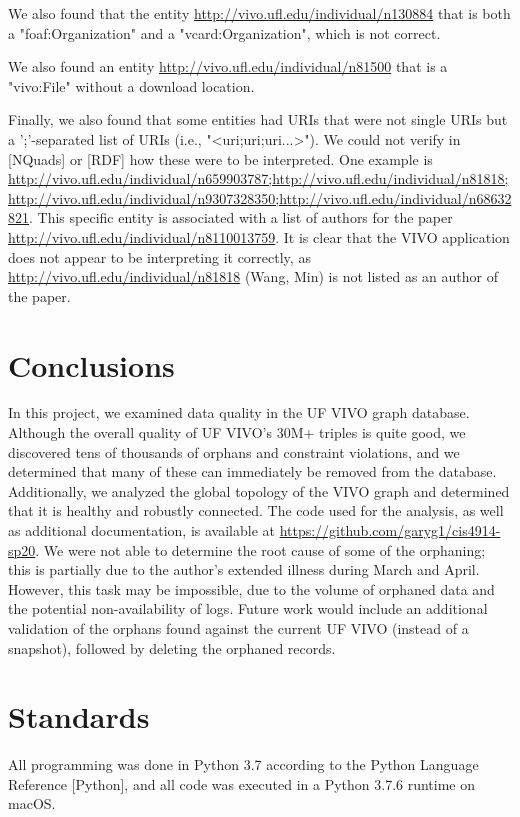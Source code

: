 \documentclass[11pt]{article}
\begin{document}
We also found that the entity \url{http://vivo.ufl.edu/individual/n130884} that is both a "foaf:Organization" and a "vcard:Organization", which is not correct.

We also found an entity \url{http://vivo.ufl.edu/individual/n81500} that is a "vivo:File" without a download location.

Finally, we also found that some entities had URIs that were not single URIs but a ';'-separated list of URIs (i.e., "<uri;uri;uri...>"). We could not verify in [NQuads] or [RDF] how these were to be interpreted. One example is \url{http://vivo.ufl.edu/individual/n659903787;http://vivo.ufl.edu/individual/n81818;http://vivo.ufl.edu/individual/n9307328350;http://vivo.ufl.edu/individual/n68632821}. This specific entity is associated with a list of authors for the paper \url{http://vivo.ufl.edu/individual/n8110013759}. It is clear that the VIVO application does not appear to be interpreting it correctly, as \url{http://vivo.ufl.edu/individual/n81818} (Wang, Min) is not listed as an author of the paper.

\section*{Conclusions}
In this project, we examined data quality in the UF VIVO graph database. Although the overall quality of UF VIVO's 30M+ triples is quite good, we discovered tens of thousands of orphans and constraint violations, and we determined that many of these can immediately be removed from the database. Additionally, we analyzed the global topology of the VIVO graph and determined that it is healthy and robustly connected. The code used for the analysis, as well as additional documentation, is available at \url{https://github.com/garyg1/cis4914-sp20}. We were not able to determine the root cause of some of the orphaning; this is partially due to the author's extended illness during March and April. However, this task may be impossible, due to the volume of orphaned data and the potential non-availability of logs. Future work would include an additional validation of the orphans found against the current UF VIVO (instead of a snapshot), followed by deleting the orphaned records.

\section*{Standards}
All programming was done in Python 3.7 according to the Python Language Reference [Python], and all code was executed in a Python 3.7.6 runtime on macOS.
\end{document}
